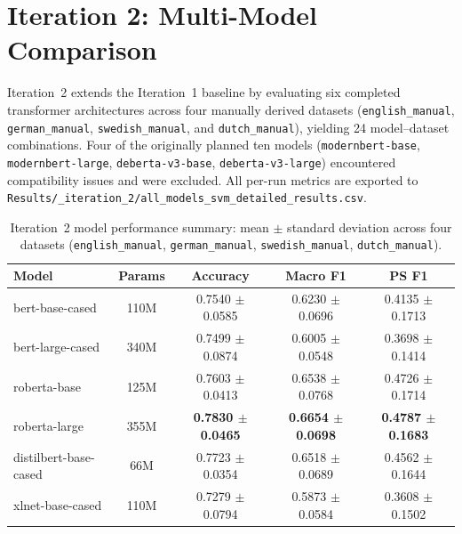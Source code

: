 \documentclass[11pt, titlepage, bibliography=totoc]{scrreprt}
\begin{document}
\section{Iteration 2: Multi-Model Comparison}

Iteration~2 extends the Iteration~1 baseline by evaluating six completed transformer architectures across four manually derived datasets (\texttt{english\_manual}, \texttt{german\_manual}, \texttt{swedish\_manual}, and \texttt{dutch\_manual}), yielding 24 model--dataset combinations. Four of the originally planned ten models (\texttt{modernbert-base}, \texttt{modernbert-large}, \texttt{deberta-v3-base}, \texttt{deberta-v3-large}) encountered compatibility issues and were excluded. All per-run metrics are exported to \texttt{Results/\_iteration\_2/all\_models\_svm\_detailed\_results.csv}.

\begin{table}[htbp]
\centering
\caption{Iteration~2 model performance summary: mean $\pm$ standard deviation across four datasets (\texttt{english\_manual}, \texttt{german\_manual}, \texttt{swedish\_manual}, \texttt{dutch\_manual}).}
\label{tab:results-iter2-models}
\begin{tabular}{@{}lcccc@{}}
\toprule
\textbf{Model} & \textbf{Params} & \textbf{Accuracy} & \textbf{Macro F1} & \textbf{PS F1} \\
\midrule
bert-base-cased       & 110M & 0.7540 $\pm$ 0.0585 & 0.6230 $\pm$ 0.0696 & 0.4135 $\pm$ 0.1713 \\
bert-large-cased      & 340M & 0.7499 $\pm$ 0.0874 & 0.6005 $\pm$ 0.0548 & 0.3698 $\pm$ 0.1414 \\
roberta-base          & 125M & 0.7603 $\pm$ 0.0413 & 0.6538 $\pm$ 0.0768 & 0.4726 $\pm$ 0.1714 \\
roberta-large         & 355M & \textbf{0.7830 $\pm$ 0.0465} & \textbf{0.6654 $\pm$ 0.0698} & \textbf{0.4787 $\pm$ 0.1683} \\
distilbert-base-cased &  66M & 0.7723 $\pm$ 0.0354 & 0.6518 $\pm$ 0.0689 & 0.4562 $\pm$ 0.1644 \\
xlnet-base-cased      & 110M & 0.7279 $\pm$ 0.0794 & 0.5873 $\pm$ 0.0584 & 0.3608 $\pm$ 0.1502 \\
\bottomrule
\end{tabular}
\end{table}
\end{document}

